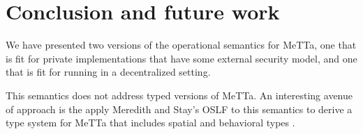\section{Conclusion and future work}

We have presented two versions of the operational semantics for MeTTa, one that is fit for private implementations that have some external security model, and one that is fit for running in a decentralized setting.

This semantics does not address typed versions of MeTTa. An interesting avenue of approach is the apply Meredith and Stay's OSLF to this semantics to derive a type system for MeTTa that includes spatial and behavioral types \cite{DBLP:journals/corr/abs-2102-04672}.
